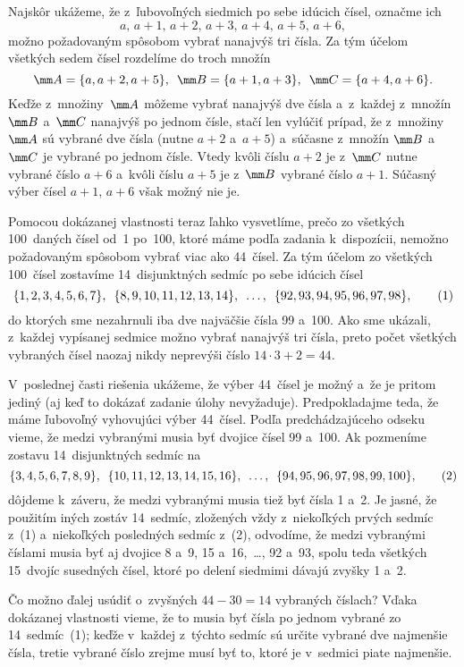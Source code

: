 {%
Najskôr ukážeme, že z~ľubovoľných siedmich po sebe idúcich čísel,
označme ich
$$
a,\,a+1,\,a+2,\,a+3,\,a+4,\,a+5,\,a+6,
$$
možno požadovaným spôsobom vybrať nanajvýš tri čísla. Za tým účelom všetkých
sedem čísel rozdelíme do troch množín
$$
\mm A=\{a,a+2,a+5\},\quad
\mm B=\{a+1,a+3\},\quad
\mm C=\{a+4,a+6\}.
$$
Keďže z~množiny~$\mm A$ môžeme vybrať nanajvýš dve čísla
a~z~každej z~množín $\mm B$ a~$\mm C$ nanajvýš po jednom čísle, stačí len vylúčiť
prípad, že z~množiny~$\mm A$ sú vybrané dve čísla (nutne $a+2$ a~$a+5$)
a~súčasne z~množín $\mm B$ a~$\mm C$ je vybrané po jednom čísle.
Vtedy kvôli číslu $a+2$
je z~$\mm C$ nutne vybrané číslo $a+6$ a~kvôli číslu $a+5$ je z~$\mm B$
vybrané číslo $a+1$. Súčasný výber čísel $a+1$, $a+6$ však možný
nie je.

Pomocou dokázanej vlastnosti teraz ľahko vysvetlíme, prečo zo všetkých
100~daných čísel od~1 po~100, ktoré máme podľa zadania k~dispozícii, nemožno
požadovaným spôsobom vybrať viac ako 44~čísel.
Za tým účelom zo všetkých 100~čísel zostavíme 14~disjunktných sedmíc po sebe
idúcich čísel
$$
\let\quad\enspace
\{1,2,3,4,5,6,7\},\quad
\{8,9,10,11,12,13,14\},\quad\dots,\quad
\{92,93,94,95,96,97,98\},
\tag1
$$
do ktorých sme nezahrnuli iba dve najväčšie čísla 99 a~100. Ako
sme ukázali, z~každej vypísanej sedmice možno vybrať nanajvýš tri
čísla, preto počet všetkých vybraných čísel naozaj nikdy
neprevýši číslo $14\cdot3+2=44$.

V~poslednej časti riešenia ukážeme, že výber 44~čísel je možný a~že
je pritom jediný (aj keď to dokázať zadanie úlohy nevyžaduje).
Predpokladajme teda, že máme ľubovoľný
vyhovujúci výber 44~čísel. Podľa predchádzajúceho odseku vieme, že
medzi vybranými musia byť dvojice čísel 99 a~100. Ak pozmeníme
zostavu 14~disjunktných sedmíc na
$$
\let\quad\enspace
\{3,4,5,6,7,8,9\},\quad
\{10,11,12,13,14,15,16\},\quad\dots,\quad
\{94,95,96,97,98,99,100\}, \tag2
$$
dôjdeme k~záveru, že medzi vybranými musia tiež byť čísla 1 a~2.
Je jasné, že použitím iných zostáv 14~sedmíc, zložených vždy z~niekoľkých
prvých sedmíc z~(1) a~niekoľkých posledných sedmíc z~(2), odvodíme, že medzi vybranými
číslami musia byť aj dvojice 8 a~9, 15 a~16,~\dots, 92 a~93,
spolu teda všetkých 15~dvojíc susedných čísel, ktoré po
delení siedmimi dávajú zvyšky 1 a~2.

Čo možno ďalej usúdiť
o~zvyšných $44-30=14$ vybraných číslach? Vďaka dokázanej
vlastnosti vieme, že to musia byť čísla po jednom vybrané
zo 14~sedmíc~(1); keďže v~každej z~týchto sedmíc sú určite
vybrané dve najmenšie čísla, tretie vybrané číslo zrejme musí byť to,
ktoré je v~sedmici piate najmenšie.

}
